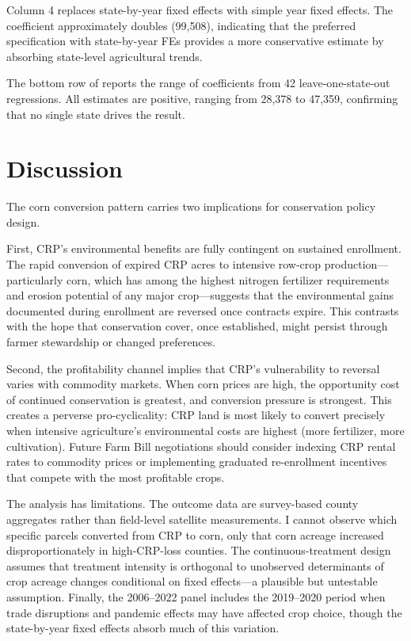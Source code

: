 \documentclass[12pt]{article}
\begin{document}
Column 4 replaces state-by-year fixed effects with simple year fixed effects. The coefficient approximately doubles (99,508), indicating that the preferred specification with state-by-year FEs provides a more conservative estimate by absorbing state-level agricultural trends.

The bottom row of  reports the range of coefficients from 42 leave-one-state-out regressions. All estimates are positive, ranging from 28,378 to 47,359, confirming that no single state drives the result.



\section{Discussion}

The corn conversion pattern carries two implications for conservation policy design.

First, CRP's environmental benefits are fully contingent on sustained enrollment. The rapid conversion of expired CRP acres to intensive row-crop production---particularly corn, which has among the highest nitrogen fertilizer requirements and erosion potential of any major crop---suggests that the environmental gains documented during enrollment \citep{morefield2016grasslands, sullivan2004design} are reversed once contracts expire. This contrasts with the hope that conservation cover, once established, might persist through farmer stewardship or changed preferences.

Second, the profitability channel implies that CRP's vulnerability to reversal varies with commodity markets. When corn prices are high, the opportunity cost of continued conservation is greatest, and conversion pressure is strongest. This creates a perverse pro-cyclicality: CRP land is most likely to convert precisely when intensive agriculture's environmental costs are highest (more fertilizer, more cultivation). Future Farm Bill negotiations should consider indexing CRP rental rates to commodity prices or implementing graduated re-enrollment incentives that compete with the most profitable crops.

The analysis has limitations. The outcome data are survey-based county aggregates rather than field-level satellite measurements. I cannot observe which specific parcels converted from CRP to corn, only that corn acreage increased disproportionately in high-CRP-loss counties. The continuous-treatment design assumes that treatment intensity is orthogonal to unobserved determinants of crop acreage changes conditional on fixed effects---a plausible but untestable assumption. Finally, the 2006--2022 panel includes the 2019--2020 period when trade disruptions and pandemic effects may have affected crop choice, though the state-by-year fixed effects absorb much of this variation.
\end{document}
